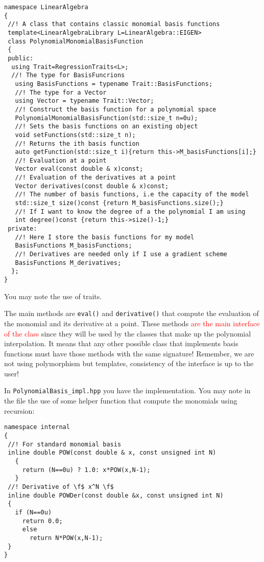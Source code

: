 \documentclass{article}
\newcommand{\li}{\lstinline}
\begin{document}
\begin{lstlisting}[title={PolynomialBasis.hpp}]
namespace LinearAlgebra
{
 //! A class that contains classic monomial basis functions
 template<LinearAlgebraLibrary L=LinearAlgebra::EIGEN>
 class PolynomialMonomialBasisFunction
 {
 public:
  using Trait=RegressionTraits<L>;
  //! The type for BasisFuncrions
   using BasisFunctions = typename Trait::BasisFunctions;
   //! The type for a Vector
   using Vector = typename Trait::Vector;
   //! Construct the basis function for a polynomial space
   PolynomialMonomialBasisFunction(std::size_t n=0u);
   //! Sets the basis functions on an existing object
   void setFunctions(std::size_t n);
   //! Returns the ith basis function
   auto getFunction(std::size_t i){return this->M_basisFunctions[i];}
   //! Evaluation at a point
   Vector eval(const double & x)const;
   //! Evaluation of the derivatives at a point
   Vector derivatives(const double & x)const;
   //! The number of basis functions, i.e the capacity of the model
   std::size_t size()const {return M_basisFunctions.size();}
   //! If I want to know the degree of a the polynomial I am using
   int degree()const {return this->size()-1;}
 private:
   //! Here I store the basis functions for my model
   BasisFunctions M_basisFunctions;
   //! Derivatives are needed only if I use a gradient scheme
   BasisFunctions M_derivatives;
  };
}
\end{lstlisting}
You may note the use of traits.

The main methods are \li!eval()! and \li!derivative()! that compute
the evaluation of the monomial and its derivative at a point. These
methods \textcolor{red}{are the main interface of the class} since
they will be used by the classes that make up the polynomial
interpolation. It means that any other possible class that implements
basis functions must have those methods with the same signature!
Remember, we are not using polymorphism but templates, consistency of
the interface is up to the user!

In \texttt{PolynomialBasis\_impl.hpp} you have the implementation.
You may note in the file the use of some helper function that compute the monomials using recursion:
\begin{lstlisting}[title={The function for computing a monomial}]
  namespace internal
{
 //! For standard monomial basis
 inline double POW(const double & x, const unsigned int N)
   {
     return (N==0u) ? 1.0: x*POW(x,N-1);
   }
 //! Derivative of \f$ x^N \f$
 inline double POWDer(const double &x, const unsigned int N)
 {
   if (N==0u)
     return 0.0;
     else
       return N*POW(x,N-1);
 }
}
\end{lstlisting}
\end{document}
